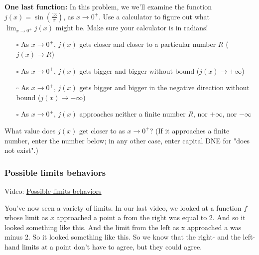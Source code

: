 \documentclass[pdftex, brazil, 12pt, twoside]{article}
\begin{document}
\begin{exercise}
  \textbf{One last function:} In this problem, we we'll examine the function
  $\displaystyle j(x) = \sin{\left(\frac{13}{x}\right)}$, as $x \to 0^{+}$. Use a
  calculator to figure out what $\displaystyle \lim_{x \to 0^{+}} j(x)$ might be.
  Make sure your calculator is in radians!
    \begin{itemize}[noitemsep]
  \item[$\square$] As $x \to 0^{+}$, $j(x)$ gets closer and closer to a particular number $R$
    ($j(x) \to R$)
  \item[$\square$] As $x \to 0^{+}$, $j(x)$ gets bigger and bigger without bound
    ($j(x) \to +\infty$)
\item[$\square$] As $x \to 0^{+}$, $j(x)$ gets bigger and bigger in the negative direction without bound
    ($j(x) \to -\infty$)  
\item[$\square$] As $x \to 0^{+}$, $j(x)$ approaches neither a finite number $R$, nor $+\infty$,
  nor $-\infty$
  \end{itemize}
\end{exercise}

\begin{exercise}
  What value does $j(x)$ get closer to as $x \to 0^{+}$? (If it approaches a finite
  number, enter the number below; in any other case, enter capital DNE for "does not exist".)
\end{exercise}
  

\subsubsection{Possible limits behaviors}
\label{u0-intro-behaviors}

Video: \href{https://www.youtube.com/watch?v=LCdQyNilFn8}{Possible limits behaviors}

You've now seen a variety of limits.
In our last video, we looked at a function $f$
whose limit as $x$ approached a point a from the right
was equal to $2$.
And so it looked something like this.
And the limit from the left as x approached a was minus 2.
So it looked something like this.
So we know that the right- and the left-hand limits at a point
don't have to agree, but they could agree.
\end{document}
